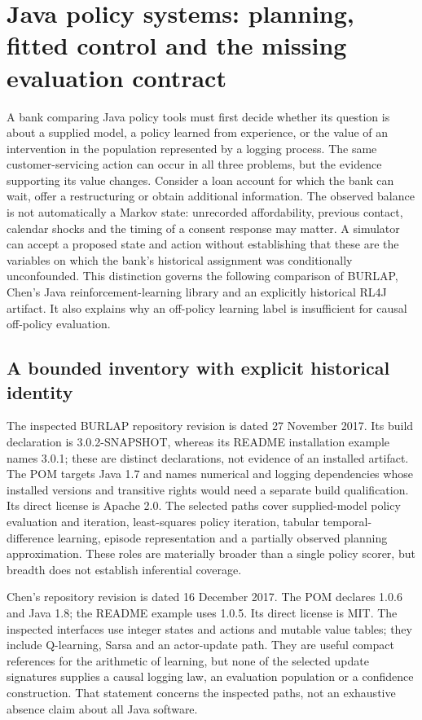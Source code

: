 \section{Java policy systems: planning, fitted control and the missing evaluation contract}
\label{sec:exec24-policies-java}
A bank comparing Java policy tools must first decide whether its question is about a supplied model, a policy learned from experience, or the value of an intervention in the population represented by a logging process. The same customer-servicing action can occur in all three problems, but the evidence supporting its value changes. Consider a loan account for which the bank can wait, offer a restructuring or obtain additional information. The observed balance is not automatically a Markov state: unrecorded affordability, previous contact, calendar shocks and the timing of a consent response may matter. A simulator can accept a proposed state and action without establishing that these are the variables on which the bank's historical assignment was conditionally unconfounded. This distinction governs the following comparison of BURLAP, Chen's Java reinforcement-learning library and an explicitly historical RL4J artifact. It also explains why an off-policy learning label is insufficient for causal off-policy evaluation.\citep{exec24_policyjava_burlap,exec24_policyjava_chen,exec24_policyjava_rl4j,exec24_policyjava_comparison}

\subsection{A bounded inventory with explicit historical identity}
The inspected BURLAP repository revision is dated 27 November 2017. Its build declaration is 3.0.2-SNAPSHOT, whereas its README installation example names 3.0.1; these are distinct declarations, not evidence of an installed artifact. The POM targets Java 1.7 and names numerical and logging dependencies whose installed versions and transitive rights would need a separate build qualification. Its direct license is Apache 2.0. The selected paths cover supplied-model policy evaluation and iteration, least-squares policy iteration, tabular temporal-difference learning, episode representation and a partially observed planning approximation. These roles are materially broader than a single policy scorer, but breadth does not establish inferential coverage.\citep{exec24_policyjava_burlap}

Chen's repository revision is dated 16 December 2017. The POM declares 1.0.6 and Java 1.8; the README example uses 1.0.5. Its direct license is MIT. The inspected interfaces use integer states and actions and mutable value tables; they include Q-learning, Sarsa and an actor-update path. They are useful compact references for the arithmetic of learning, but none of the selected update signatures supplies a causal logging law, an evaluation population or a confidence construction. That statement concerns the inspected paths, not an exhaustive absence claim about all Java software.\citep{exec24_policyjava_chen}


